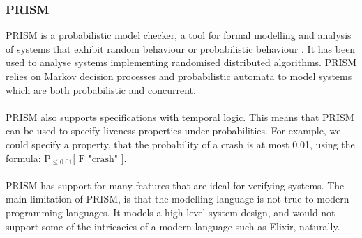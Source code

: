 \subsubsection*{\textbf{PRISM}}
PRISM is a probabilistic model checker, a tool for formal modelling and analysis of systems that exhibit random behaviour or probabilistic behaviour \cite{prism}. It has been used to analyse systems implementing randomised distributed algorithms. PRISM relies on Markov decision processes and probabilistic automata to model systems which are both probabilistic and concurrent.
\\ \\
PRISM also supports specifications with temporal logic. This means that PRISM can be used to specify liveness properties under probabilities. For example, we could specify a property, that the probability of a crash is at most 0.01, using the formula: $\text{P}_{\leq 0.01} \text{[ F "crash" ]}$.
\\ \\
PRISM has support for many features that are ideal for verifying systems. The main limitation of PRISM, is that the modelling language is not true to modern programming languages. It models a high-level system design, and would not support some of the intricacies of a modern language such as Elixir, naturally.
